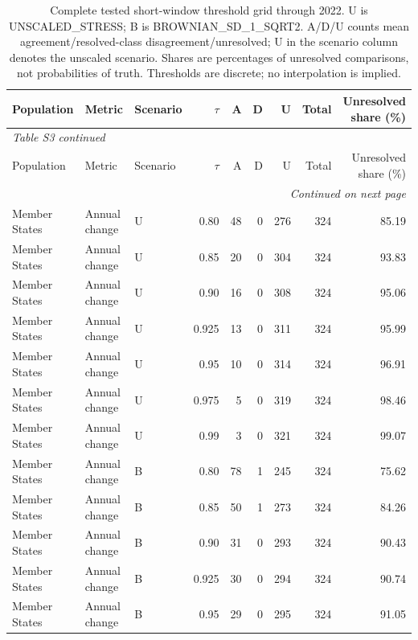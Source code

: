 \begingroup
\footnotesize
\setlength{\tabcolsep}{3pt}
\setlength{\LTcapwidth}{\linewidth}
\renewcommand{\arraystretch}{1.1}
\begin{longtable}{lllrrrrrr}
\caption{Complete tested short-window threshold grid through 2022. U is UNSCALED\_STRESS; B is BROWNIAN\_SD\_1\_SQRT2. A/D/U counts mean agreement/resolved-class disagreement/unresolved; U in the scenario column denotes the unscaled scenario. Shares are percentages of unresolved comparisons, not probabilities of truth. Thresholds are discrete; no interpolation is implied.}\label{tab:S3} \\
\toprule
Population & Metric & Scenario & $\tau$ & A & D & U & Total & \shortstack{Unresolved\\share (\%)} \\
\midrule
\endfirsthead
\multicolumn{9}{l}{\textit{Table S3 continued}} \\
\toprule
Population & Metric & Scenario & $\tau$ & A & D & U & Total & \shortstack{Unresolved\\share (\%)} \\
\midrule
\endhead
\midrule
\multicolumn{9}{r}{\textit{Continued on next page}} \\
\endfoot
\bottomrule
\endlastfoot
Member States & Annual change & U & 0.80 & 48 & 0 & 276 & 324 & 85.19 \\
Member States & Annual change & U & 0.85 & 20 & 0 & 304 & 324 & 93.83 \\
Member States & Annual change & U & 0.90 & 16 & 0 & 308 & 324 & 95.06 \\
Member States & Annual change & U & 0.925 & 13 & 0 & 311 & 324 & 95.99 \\
Member States & Annual change & U & 0.95 & 10 & 0 & 314 & 324 & 96.91 \\
Member States & Annual change & U & 0.975 & 5 & 0 & 319 & 324 & 98.46 \\
Member States & Annual change & U & 0.99 & 3 & 0 & 321 & 324 & 99.07 \\
Member States & Annual change & B & 0.80 & 78 & 1 & 245 & 324 & 75.62 \\
Member States & Annual change & B & 0.85 & 50 & 1 & 273 & 324 & 84.26 \\
Member States & Annual change & B & 0.90 & 31 & 0 & 293 & 324 & 90.43 \\
Member States & Annual change & B & 0.925 & 30 & 0 & 294 & 324 & 90.74 \\
Member States & Annual change & B & 0.95 & 29 & 0 & 295 & 324 & 91.05 \\

\end{longtable}
